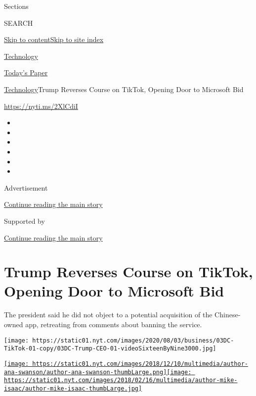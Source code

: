 Sections

SEARCH

\protect\hyperlink{site-content}{Skip to
content}\protect\hyperlink{site-index}{Skip to site index}

\href{https://www.nytimes.com/section/technology}{Technology}

\href{https://myaccount.nytimes.com/auth/login?response_type=cookie\&client_id=vi}{}

\href{https://www.nytimes.com/section/todayspaper}{Today's Paper}

\href{/section/technology}{Technology}\textbar{}Trump Reverses Course on
TikTok, Opening Door to Microsoft Bid

\href{https://nyti.ms/2XlCdiI}{https://nyti.ms/2XlCdiI}

\begin{itemize}
\item
\item
\item
\item
\item
\item
\end{itemize}

Advertisement

\protect\hyperlink{after-top}{Continue reading the main story}

Supported by

\protect\hyperlink{after-sponsor}{Continue reading the main story}

\hypertarget{trump-reverses-course-on-tiktok-opening-door-to-microsoft-bid}{%
\section{Trump Reverses Course on TikTok, Opening Door to Microsoft
Bid}\label{trump-reverses-course-on-tiktok-opening-door-to-microsoft-bid}}

The president said he did not object to a potential acquisition of the
Chinese-owned app, retreating from comments about banning the service.

\texttt{[image: https://static01.nyt.com/images/2020/08/03/business/03DC-TikTok-01-copy/03DC-Trump-CEO-01-videoSixteenByNine3000.jpg]}

\href{https://www.nytimes.com/by/ana-swanson}{\texttt{[image: https://static01.nyt.com/images/2018/12/10/multimedia/author-ana-swanson/author-ana-swanson-thumbLarge.png]}}\href{https://www.nytimes.com/by/mike-isaac}{\texttt{[image: https://static01.nyt.com/images/2018/02/16/multimedia/author-mike-isaac/author-mike-isaac-thumbLarge.jpg]}}

